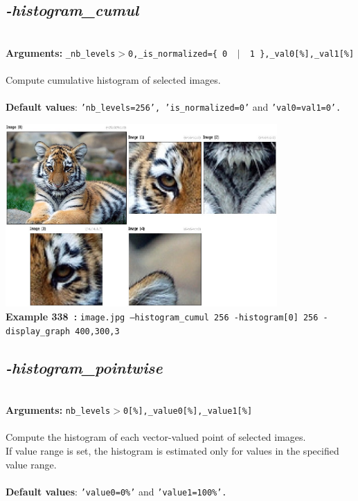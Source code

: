 \documentclass[a4paper,11pt,twoside]{book}
\begin{document}
\subsection{\emph{-histogram\_cumul} }\vspace*{-0.5em}
~\\\textbf{Arguments: } 
{\small \texttt{\_nb\_levels$>$0,\_is\_normalized=\{ 0 ~$|$~ 1 \},\_val0[\%],\_val1[\%]}}\\~\\
Compute cumulative histogram of selected images.
~\\~\\\textbf{Default values}: {\small \texttt{'nb\_levels=256', 'is\_normalized=0'} and \texttt{'val0=val1=0'.}}
\begin{center}\includegraphics[keepaspectratio=true,height=7cm,width=\textwidth]{img/gmic_def338.jpg}\\
{\footnotesize \textbf{Example 338~:} \texttt{image.jpg --histogram\_cumul 256 -histogram[0] 256 -display\_graph 400,300,3}}
\end{center}

\subsection{\emph{-histogram\_pointwise} }\vspace*{-0.5em}
~\\\textbf{Arguments: } 
{\small \texttt{nb\_levels$>$0[\%],\_value0[\%],\_value1[\%]}}\\~\\
Compute the histogram of each vector-valued point of selected images.
~\\If value range is set, the histogram is estimated only for values in the specified
value range.
~\\~\\\textbf{Default values}: {\small \texttt{'value0=0\%'} and \texttt{'value1=100\%'.}}
\end{document}
